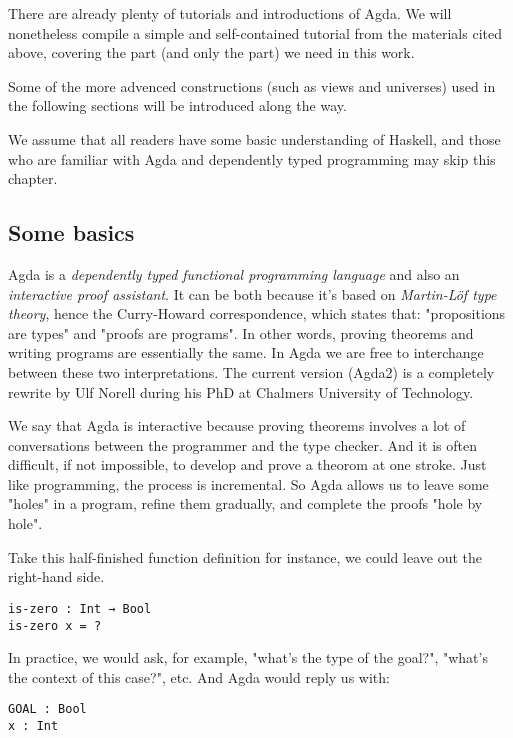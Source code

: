 \documentclass[12pt, a4paper]{article}
\begin{document}
There are already plenty of tutorials and introductions of Agda\cite{norell2009dependently}\cite{FLOLAC16DTP}\cite{brutal}.
We will nonetheless compile a simple and self-contained tutorial from the
materials cited above, covering the part (and only the part) we need in this work.

Some of the more advenced constructions (such as views and universes) used in
the following sections will be introduced along the way.

We assume that all readers have some basic understanding of Haskell, and those
who are familiar with Agda and dependently typed programming may skip this chapter.

\subsection{Some basics}

Agda is a \textit{dependently typed functional programming language} and also an
\textit{interactive proof assistant}. It can be both because it's based on
\textit{Martin-Löf type theory}\cite{martin1984intuitionistic}, hence the Curry-Howard
correspondence\cite{sorensen2006lectures}, which states that: "propositions are types"
and "proofs are programs". In other words, proving theorems and writing programs
are essentially the same. In Agda we are free to interchange between these two
interpretations. The current version (Agda2) is a completely rewrite by Ulf Norell
during his PhD at Chalmers University of Technology.

We say that Agda is interactive because proving
theorems involves a lot of conversations between the programmer and the type checker.
And it is often difficult, if not impossible, to develop and prove a theorom at one stroke.
Just like programming, the process is incremental.
So Agda allows us to leave some "holes" in a program, refine them gradually, and
complete the proofs "hole by hole".

Take this half-finished function definition for instance, we could leave out the
right-hand side.

\begin{lstlisting}
is-zero : Int → Bool
is-zero x = ?
\end{lstlisting}

In practice, we would ask, for example, "what's the type of the goal?",
 "what's the context of this case?", etc. And Agda would reply us with:

\begin{lstlisting}
GOAL : Bool
x : Int
\end{lstlisting}
\end{document}
